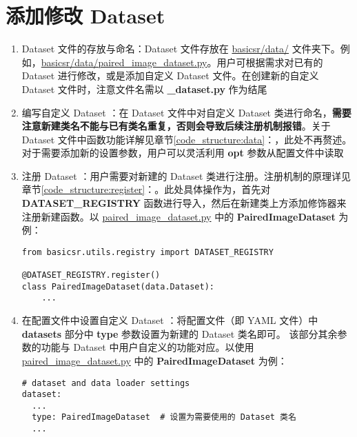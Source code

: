 \documentclass[../main.tex]{subfiles}
\begin{document}
\section{添加修改 Dataset}\label{howto:add_dataset}
\begin{enumerate}[第 1 步]
    \item Dataset 文件的存放与命名：Dataset 文件存放在 \href{https://github.com/XPixelGroup/BasicSR/tree/master/basicsr/data}{basicsr/data/} 文件夹下。例如，\href{https://github.com/XPixelGroup/BasicSR/tree/master/basicsr/data}{basicsr/data/paired\_image\_dataset.py}。用户可根据需求对已有的 Dataset 进行修改，或是添加自定义 Dataset 文件。在创建新的自定义 Dataset 文件时，注意文件名需以  \textbf{\_dataset.py} 作为结尾

    \item 编写自定义 Dataset ：在 Dataset 文件中对自定义 Dataset 类进行命名，\textbf{需要注意新建类名不能与已有类名重复，否则会导致后续注册机制报错}。关于 Dataset 文件中函数功能详解见章节\ref{code_structure:data}：，此处不再赘述。对于需要添加新的设置参数，用户可以灵活利用 \textbf{opt} 参数从配置文件中读取

    \item 注册 Dataset ：用户需要对新建的 Dataset 类进行注册。注册机制的原理详见章节\ref{code_structure:register}：。此处具体操作为，首先对 \textbf{DATASET\_REGISTRY} 函数进行导入，然后在新建类上方添加修饰器来注册新建函数。以 \href{https://github.com/XPixelGroup/BasicSR/tree/master/basicsr/data/paired_image_dataset.py}{paired\_image\_dataset.py} 中的 \textbf{PairedImageDataset} 为例：

\begin{verbatim}
from basicsr.utils.registry import DATASET_REGISTRY

@DATASET_REGISTRY.register()
class PairedImageDataset(data.Dataset):
    ...
\end{verbatim}

    \item 在配置文件中设置自定义 Dataset ：将配置文件（即 YAML 文件）中 \textbf{datasets} 部分中 \textbf{type} 参数设置为新建的 Dataset 类名即可。
          该部分其余参数的功能与 Dataset 中用户自定义的功能对应。以使用 \href{https://github.com/XPixelGroup/BasicSR/tree/master/basicsr/data/paired_image_dataset.py}{paired\_image\_dataset.py} 中的 \textbf{PairedImageDataset} 为例：

\begin{verbatim}
# dataset and data loader settings
dataset:
  ...
  type: PairedImageDataset  # 设置为需要使用的 Dataset 类名
  ...
\end{verbatim}
\end{enumerate}
\end{document}

